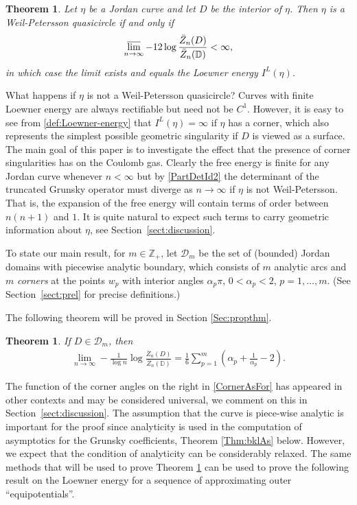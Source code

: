 \documentclass{article}
\numberwithin{equation}{section}
\numberwithin{figure}{section}
\theoremstyle{plain}
\theoremstyle{plain}
\numberwithin{thm}{section}
\newtheorem{theorem}[thm]{Theorem}
\theoremstyle{remark}
\newcommand{\D}{\mathbb{D}}
\newcommand{\Z}{\mathbb{Z}}
\begin{document}
\begin{theorem}\label{Thm:WP}
Let $\eta$ be a Jordan curve and let $D$ be the interior of $\eta$. Then $\eta$ is
a Weil-Petersson quasicircle if and only if
\begin{equation}\label{WPcrit}
\varlimsup_{n\to\infty}-12\log\frac{\bar Z_n(D)}{\bar Z_n(\D)}<\infty,
\end{equation}
in which case the limit exists and equals the Loewner energy $I^L(\eta)$.
\end{theorem}
What happens if $\eta$ is not a Weil-Petersson quasicircle? Curves with finite Loewner energy are always rectifiable but need not be $C^1$. However, it is easy to see from \eqref{def:Loewner-energy} that $I^L(\eta) = \infty$ if $\eta$ has a corner, which also represents the simplest possible geometric singularity if $D$ is viewed as a surface. The main goal of this paper is to investigate the effect that the presence of corner singularities has on the Coulomb gas. 
Clearly the free energy is finite for any Jordan curve whenever $n < \infty$ but by \eqref{PartDetId2} the determinant of the truncated Grunsky operator must diverge as $n \to \infty$ if $\eta$ is not Weil-Petersson. That is, the expansion of the free energy will contain terms of order between $n(n+1)$ and $1$. It is quite natural to expect such terms to carry geometric information about $\eta$, see Section~\ref{sect:discussion}.

To state our main result, for $m \in \Z_+$, let $\mathcal{D}_m$ be the set of (bounded) Jordan domains with piecewise analytic boundary, which consists of $m$ analytic arcs and $m$ \emph{corners} at the points $w_p$ with interior angles $\alpha_p\pi$, $0<\alpha_p<2$, $p=1,\ldots,m$. (See Section~\ref{sect:prel} for precise definitions.)

The following theorem will be proved in Section \ref{Sec:propthm}.
\begin{theorem}\label{Thm:CornerAs}
If $D\in\mathcal{D}_m$, then
\begin{align}\label{CornerAsFor}
\lim_{n\to\infty}-\frac 1{\log n} \log \frac{\bar Z_n(D)}{\bar Z_n(\D)} =\frac 16\sum_{p=1}^m \left(\alpha_p+\frac 1{\alpha_p}-2 \right).
\end{align}
\end{theorem} 
The function of the corner angles on the right in \eqref{CornerAsFor} has appeared in other contexts and may be considered universal, we comment on this in Section~\ref{sect:discussion}. The assumption that the curve is piece-wise analytic is important for the proof since analyticity is used in the computation of asymptotics for the Grunsky coefficients, Theorem \ref{Thm:bklAs} below. However, we expect that the condition of analyticity can be considerably relaxed.
The same methods that will be used to prove Theorem \ref{Thm:CornerAs} can be used to prove the following result on the Loewner energy for a sequence of approximating outer ``equipotentials''.
\end{document}
